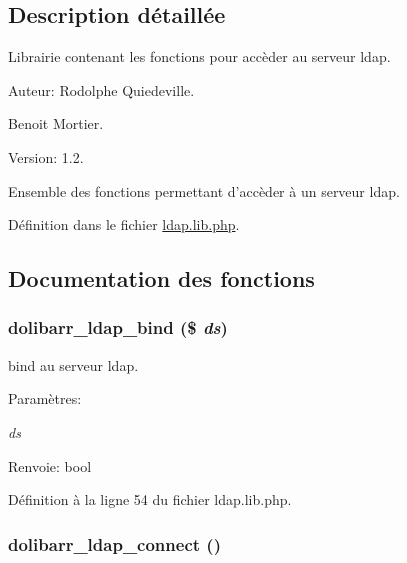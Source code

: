 \subsection{Description d\'{e}taill\'{e}e}
Librairie contenant les fonctions pour acc\`{e}der au serveur ldap. 

\begin{Desc}
\item[Auteur:]Rodolphe Quiedeville. 

Benoit Mortier. \end{Desc}
\begin{Desc}
\item[Version:]1.2.\end{Desc}
Ensemble des fonctions permettant d'acc\`{e}der \`{a} un serveur ldap.

D\'{e}finition dans le fichier \hyperlink{ldap_8lib_8php-source}{ldap.lib.php}.

\subsection{Documentation des fonctions}
\hypertarget{ldap_8lib_8php_a1}{
\subsubsection[dolibarr\_\-ldap\_\-bind]{\setlength{\rightskip}{0pt plus 5cm}dolibarr\_\-ldap\_\-bind (\$ {\em ds})}}
\label{ldap_8lib_8php_a1}


bind au serveur ldap. 

\begin{Desc}
\item[Param\`{e}tres:]
\begin{description}
\item[{\em ds}]\end{description}
\end{Desc}
\begin{Desc}
\item[Renvoie:]bool \end{Desc}


D\'{e}finition \`{a} la ligne 54 du fichier ldap.lib.php.\hypertarget{ldap_8lib_8php_a0}{
\subsubsection[dolibarr\_\-ldap\_\-connect]{\setlength{\rightskip}{0pt plus 5cm}dolibarr\_\-ldap\_\-connect ()}}
\label{ldap_8lib_8php_a0}


